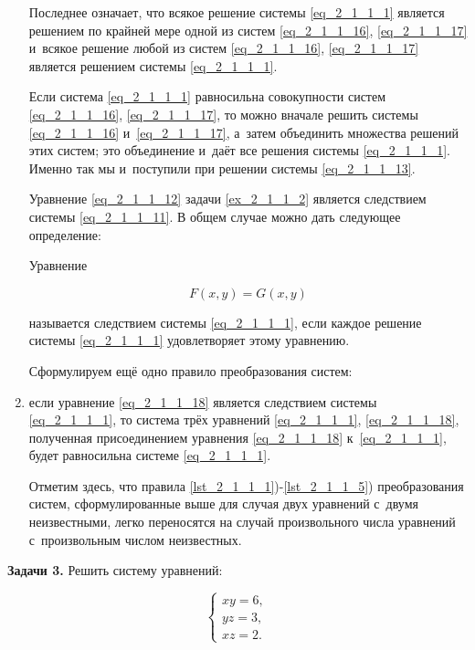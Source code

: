 \begin{enumerate}
Последнее означает, что всякое решение системы \eqref{eq_2_1_1_1} является решением
по крайней мере одной из систем \eqref{eq_2_1_1_16}, \eqref{eq_2_1_1_17} и~всякое
решение любой из систем \eqref{eq_2_1_1_16}, \eqref{eq_2_1_1_17} является решением
системы \eqref{eq_2_1_1_1}.

Если система \eqref{eq_2_1_1_1} равносильна совокупности систем \eqref{eq_2_1_1_16},
\eqref{eq_2_1_1_17}, то можно вначале решить системы
\eqref{eq_2_1_1_16} и~\eqref{eq_2_1_1_17},
а~затем объединить множества решений этих систем;
это объединение и~даёт все решения системы \eqref{eq_2_1_1_1}.
Именно так мы и~поступили при решении системы \eqref{eq_2_1_1_13}.

Уравнение \eqref{eq_2_1_1_12} задачи \ref{ex_2_1_1_2} является следствием системы
\eqref{eq_2_1_1_11}. В общем случае можно дать следующее определение:

Уравнение

\begin{equation}\label{eq_2_1_1_18}
F(x, y) = G(x, y)
\end{equation}

называется следствием системы \eqref{eq_2_1_1_1},
если каждое решение системы \eqref{eq_2_1_1_1} удовлетворяет этому уравнению.

Сформулируем ещё одно правило преобразования систем:

\item \label{lst_2_1_1_5} если уравнение \eqref{eq_2_1_1_18} является следствием системы
\eqref{eq_2_1_1_1}, то система трёх уравнений {\eqref{eq_2_1_1_1}, \eqref{eq_2_1_1_18}},
полученная присоединением уравнения \eqref{eq_2_1_1_18} к~\eqref{eq_2_1_1_1},
будет равносильна системе \eqref{eq_2_1_1_1}.

Отметим здесь, что правила \ref{lst_2_1_1_1})-\ref{lst_2_1_1_5}) преобразования систем,
сформулированные выше для случая двух уравнений с~двумя неизвестными,
легко переносятся на случай произвольного числа уравнений
с~произвольным числом неизвестных.

\end{enumerate}

\textbf{Задачи 3.} Решить систему уравнений:

\begin{equation}\label{eq_2_1_1_19}
\begin{cases}
xy = 6, \\
yz = 3, \\
xz = 2.
\end{cases}
\end{equation}

